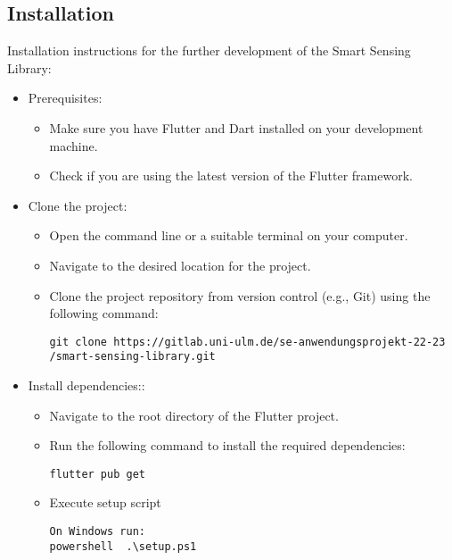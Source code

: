 \documentclass[12pt]{article}
\newcounter{fr}
\begin{document}
\subsection{Installation}
\label{ssec:demoapp}
Installation instructions for the further development of the Smart Sensing Library:
\begin{itemize}
    \item Prerequisites:
        \begin{itemize}
        \item Make sure you have Flutter and Dart installed on your development machine.
        \item Check if you are using the latest version of the Flutter framework.
        \end{itemize}
    \item Clone the project:
        \begin{itemize}
        \item Open the command line or a suitable terminal on your computer.
        \item Navigate to the desired location for the project.
        \item Clone the project repository from version control (e.g., Git) using the following command:
\begin{verbatim}
git clone https://gitlab.uni-ulm.de/se-anwendungsprojekt-22-23
/smart-sensing-library.git
\end{verbatim}
        \end{itemize}
    \item Install dependencies::
        \begin{itemize}
        \item Navigate to the root directory of the Flutter project.
        \item Run the following command to install the required dependencies:
\begin{verbatim}
flutter pub get
\end{verbatim}
        \item Execute setup script
\begin{verbatim}
On Windows run:
powershell  .\setup.ps1


\end{verbatim}
\end{itemize}
\end{itemize}
\end{document}
